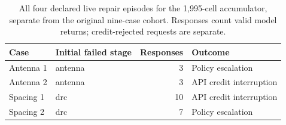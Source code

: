 \begin{table}[htbp]\centering\small\setlength{\tabcolsep}{4pt}
\caption{All four declared live repair episodes for the 1,995-cell accumulator, separate from the original nine-case cohort. Responses count valid model returns; credit-rejected requests are separate.}\label{tab:largerepair}
\begin{tabular}{@{}llrl@{}}\toprule
Case & Initial failed stage & Responses & Outcome \\
\midrule
Antenna 1 & antenna & 3 & Policy escalation \\
Antenna 2 & antenna & 3 & API credit interruption \\
Spacing 1 & drc & 10 & API credit interruption \\
Spacing 2 & drc & 7 & Policy escalation \\
\bottomrule\end{tabular}\end{table}
